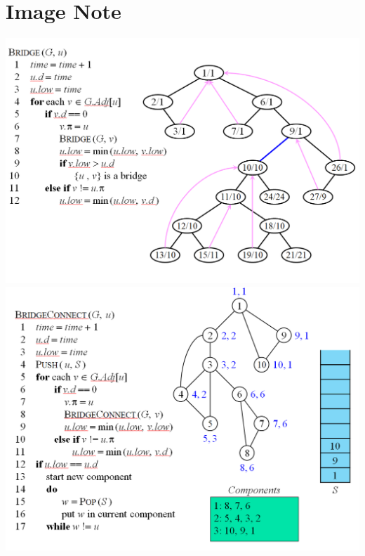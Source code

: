 \documentclass[a4paper, landscape, 8pt]{article}
\begin{document}
\section{Image Note}
\includegraphics[]{Bridge} \clearpage
\includegraphics[]{BridgeConnect} \clearpage
\end{document}
